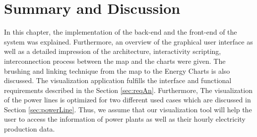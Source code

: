 \section{Summary and Discussion}

In this chapter, the implementation of the back-end and the front-end of the system was explained. Furthermore, an overview of the graphical user interface as well as a detailed impression of the architecture, interactivity scripting, interconnection process between the map and the charts were given. The brushing and linking technique from the map to the Energy Charts is also discussed. The visualization application fulfills the interface and functional requirements described in the Section \ref{sec:reqAn}. Furthermore, The visualization of the power lines is optimized for two different used cases which are discussed in Section \ref{sec:powerLine}. Thus, we assume that our visualization tool will help the user to access the information of power plants as well as their hourly electricity production data.
